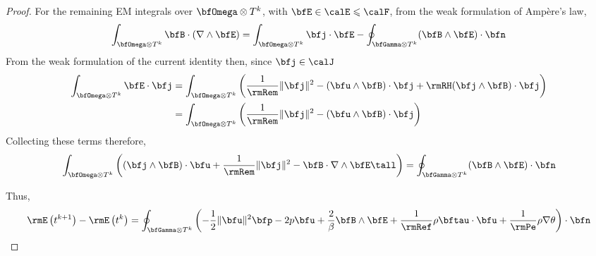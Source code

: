\begin{proof}
            For the remaining EM integrals over $\bfOmega\otimes T^{k}$, with $\bfE  \in  \calE  \leqslant  \calF$, from the weak formulation of Ampère's law,
            \begin{equation}
                \int_{\bfOmega\otimes T^{k}}\bfB\cdot(\nabla\wedge\bfE)  =  \int_{\bfOmega\otimes T^{k}}\bfj\cdot\bfE - \oint_{\bfGamma\otimes T^{k}}(\bfB\wedge\bfE)\cdot\bfn
            \end{equation}
            From the weak formulation of the current identity then, since $\bfj  \in  \calJ$
            \begin{align}
                \int_{\bfOmega\otimes T^{k}}\bfE\cdot\bfj  &=  \int_{\bfOmega\otimes T^{k}}\left(\frac{1}{\rmRem}\|\bfj\|^{2} - (\bfu\wedge\bfB)\cdot\bfj + \rmRH(\bfj\wedge\bfB)\cdot\bfj\right)  \\
                &=  \int_{\bfOmega\otimes T^{k}}\left(\frac{1}{\rmRem}\|\bfj\|^{2} - (\bfu\wedge\bfB)\cdot\bfj\right)
            \end{align}
            Collecting these terms therefore,
            \begin{equation}
                \int_{\bfOmega\otimes T^{k}}\left((\bfj\wedge\bfB)\cdot\bfu + \frac{1}{\rmRem}\|\bfj\|^{2} - \bfB\cdot\nabla\wedge\bfE\tall\right)  =  \oint_{\bfGamma\otimes T^{k}}(\bfB\wedge\bfE)\cdot\bfn
            \end{equation}
    
            Thus,
            \begin{equation}
                \rmE\left(t^{k + 1}\right) - \rmE\left(t^{k}\right)  =  \oint_{\bfGamma\otimes T^{k}}\left(- \frac{1}{2}\|\bfu\|^{2}\bfp - 2p\bfu + \frac{2}{\beta}\bfB\wedge\bfE + \frac{1}{\rmRef}\rho\bftau\cdot\bfu + \frac{1}{\rmPe}\rho\nabla\theta\right)\cdot\bfn
            \end{equation}
        \end{proof}
    
